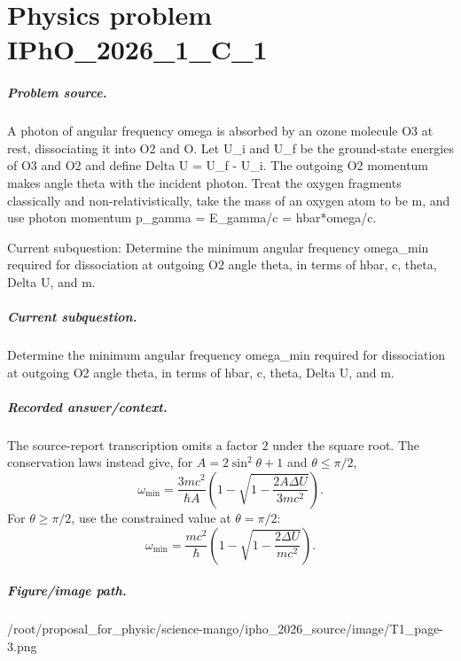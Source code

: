 
\chapter{Physics problem IPhO\_2026\_1\_C\_1}
\label{ch:IPhO2026Problems_problem_IPhO_2026_1_C_1}

\paragraph{Problem source.}
A photon of angular frequency omega is absorbed by an ozone molecule O3 at rest,
dissociating it into O2 and O.  Let U\_i and U\_f be the ground-state energies of
O3 and O2 and define Delta U = U\_f - U\_i.  The outgoing O2 momentum makes angle
theta with the incident photon.  Treat the oxygen fragments classically and
non-relativistically, take the mass of an oxygen atom to be m, and use photon
momentum p\_gamma = E\_gamma/c = hbar*omega/c.

Current subquestion:
Determine the minimum angular frequency omega\_min required for dissociation at outgoing O2 angle theta, in terms of hbar, c, theta, Delta U, and m.

\paragraph{Current subquestion.}
Determine the minimum angular frequency omega\_min required for dissociation at outgoing O2 angle theta, in terms of hbar, c, theta, Delta U, and m.

\paragraph{Recorded answer/context.}
The source-report transcription omits a factor \(2\) under the square root.
The conservation laws instead give, for \(A=2\sin^2\theta+1\) and
\(\theta\leq\pi/2\),
\[
\omega_{\min}=\frac{3mc^2}{\hbar A}
  \left(1-\sqrt{1-\frac{2A\Delta U}{3mc^2}}\right).
\]
For \(\theta\geq\pi/2\), use the constrained value at \(\theta=\pi/2\):
\[
\omega_{\min}=\frac{mc^2}{\hbar}
  \left(1-\sqrt{1-\frac{2\Delta U}{mc^2}}\right).
\]

\paragraph{Figure/image path.}
/root/proposal\_for\_physic/science-mango/ipho\_2026\_source/image/T1\_page-3.png

